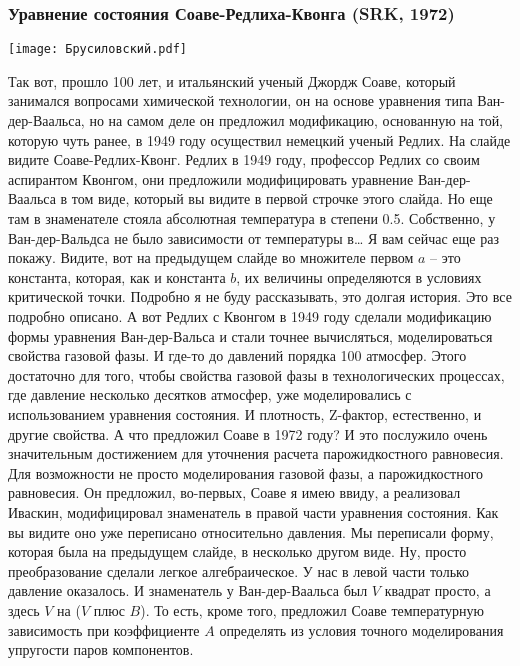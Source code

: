 \documentclass[main.tex]{subfiles}
\begin{document}
\subsubsection{Уравнение состояния Соаве-Редлиха-Квонга (SRK, 1972)}

\begin{center}
\texttt{[image: Брусиловский.pdf]}
\end{center}

Так вот, прошло 100 лет, и итальянский ученый Джордж Соаве, который занимался вопросами химической технологии, он на основе уравнения типа Ван-дер-Ваальса, но на самом деле он предложил модификацию, основанную на той, которую чуть ранее, в 1949 году осуществил немецкий ученый Редлих.
На слайде видите Соаве-Редлих-Квонг.
Редлих в 1949 году, профессор Редлих со своим аспирантом Квонгом, они предложили модифицировать уравнение Ван-дер-Ваальса в том виде, который вы видите в первой строчке этого слайда.
Но еще там в знаменателе стояла абсолютная температура в степени 0.5.
Собственно, у Ван-дер-Вальдса не было зависимости от температуры в…
Я вам сейчас еще раз покажу.
Видите, вот на предыдущем слайде во множителе первом $a$ -- это константа, которая, как и константа $b$, их величины определяются в условиях критической точки.
Подробно я не буду рассказывать, это долгая история.
Это все подробно описано.
А вот Редлих с Квонгом в 1949 году сделали модификацию формы уравнения Ван-дер-Вальса и стали точнее вычисляться, моделироваться свойства газовой фазы.
И где-то до давлений порядка 100 атмосфер.
Этого достаточно для того, чтобы свойства газовой фазы в технологических процессах, где давление несколько десятков атмосфер, уже моделировались с использованием уравнения состояния.
И плотность, Z-фактор, естественно, и другие свойства.
А что предложил Соаве в 1972 году?
И это послужило очень значительным достижением для уточнения расчета парожидкостного равновесия.
Для возможности не просто моделирования газовой фазы, а парожидкостного равновесия.
Он предложил, во-первых, Соаве я имею ввиду, а реализовал Иваскин, модифицировал знаменатель в правой части уравнения состояния.
Как вы видите оно уже переписано относительно давления.
Мы переписали форму, которая была на предыдущем слайде, в несколько другом виде.
Ну, просто преобразование сделали легкое алгебраическое.
У нас в левой части только давление оказалось.
И знаменатель у Ван-дер-Ваальса был $V$ квадрат просто, а здесь $V$ на ($V$ плюс $B$).
То есть, кроме того, предложил Соаве температурную зависимость при коэффициенте $A$ определять из условия точного моделирования упругости паров компонентов.
\end{document}
